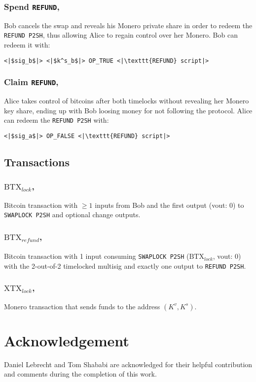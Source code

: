 \documentclass{llncs}
\begin{document}
\subsubsection{Spend \texttt{REFUND},}
Bob cancels the swap and reveals his Monero private share in order to redeem the \texttt{REFUND P2SH}, thus allowing Alice to regain control over her Monero. Bob can redeem it with:

\begin{verbatim}
<|$sig_b$|> <|$k^s_b$|> OP_TRUE <|\texttt{REFUND} script|>
\end{verbatim}

\subsubsection{Claim \texttt{REFUND},}
Alice takes control of bitcoins after both timelocks without revealing her Monero key share, ending up with Bob loosing money for not following the protocol. Alice can redeem the \texttt{REFUND P2SH} with:

\begin{verbatim}
<|$sig_a$|> OP_FALSE <|\texttt{REFUND} script|>
\end{verbatim}

\subsection{Transactions}
\subsubsection{$\text{BTX}_\textit{lock}$,}
Bitcoin transaction with $\geq 1$ inputs from Bob and the first output (vout: 0) to \texttt{SWAPLOCK P2SH} and optional change outputs.

\subsubsection{$\text{BTX}_\textit{refund}$,}
Bitcoin transaction with 1 input consuming \texttt{SWAPLOCK P2SH} ($\text{BTX}_\textit{lock}$, vout: 0) with the 2-out-of-2 timelocked multisig and exactly one output to \texttt{REFUND P2SH}.

\subsubsection{$\text{XTX}_\textit{lock}$,}
Monero transaction that sends funds to the address $(K^v,K^s)$.

\section{Acknowledgement} Daniel Lebrecht and Tom Shababi are acknowledged for their helpful contribution and comments during the completion of this work.

%
%
\printbibliography
\end{document}
